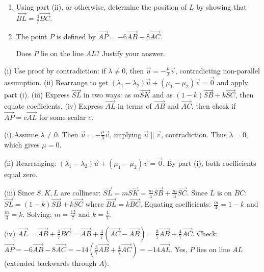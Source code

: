 \begin{problem}
\begin{center}
\end{center}

\vspace{0.3cm}

\begin{enumerate}[resume*, label=(\roman*)]
    \item Using part (ii), or otherwise, determine the position of $L$ by showing that $\vec{BL} = \frac{4}{7}\vec{BC}$.
    
    \item The point $P$ is defined by $\vec{AP} = -6\vec{AB} - 8\vec{AC}$.
    
    Does $P$ lie on the line $AL$? Justify your answer.
\end{enumerate}
\end{problem}

\begin{hint}
(i) Use proof by contradiction: if $\lambda \neq 0$, then $\vec{u} = -\frac{\mu}{\lambda}\vec{v}$, contradicting non-parallel assumption. 
(ii) Rearrange to get $(\lambda_1 - \lambda_2)\vec{u} + (\mu_1 - \mu_2)\vec{v} = \vec{0}$ and apply part (i).
(iii) Express $\vec{SL}$ in two ways: as $m\vec{SK}$ and as $(1-k)\vec{SB} + k\vec{SC}$, then equate coefficients.
(iv) Express $\vec{AL}$ in terms of $\vec{AB}$ and $\vec{AC}$, then check if $\vec{AP} = c\vec{AL}$ for some scalar $c$.
\end{hint}

\begin{solution}[Sketch]
(i) Assume $\lambda \neq 0$. Then $\vec{u} = -\frac{\mu}{\lambda}\vec{v}$, implying $\vec{u} \parallel \vec{v}$, contradiction. Thus $\lambda = 0$, which gives $\mu = 0$.

(ii) Rearranging: $(\lambda_1 - \lambda_2)\vec{u} + (\mu_1 - \mu_2)\vec{v} = \vec{0}$. By part (i), both coefficients equal zero.

(iii) Since $S, K, L$ are collinear: $\vec{SL} = m\vec{SK} = \frac{m}{4}\vec{SB} + \frac{m}{3}\vec{SC}$. Since $L$ is on $BC$: $\vec{SL} = (1-k)\vec{SB} + k\vec{SC}$ where $\vec{BL} = k\vec{BC}$. Equating coefficients: $\frac{m}{4} = 1-k$ and $\frac{m}{3} = k$. Solving: $m = \frac{12}{7}$ and $k = \frac{4}{7}$.

(iv) $\vec{AL} = \vec{AB} + \frac{4}{7}\vec{BC} = \vec{AB} + \frac{4}{7}(\vec{AC} - \vec{AB}) = \frac{3}{7}\vec{AB} + \frac{4}{7}\vec{AC}$. Check: $\vec{AP} = -6\vec{AB} - 8\vec{AC} = -14(\frac{3}{7}\vec{AB} + \frac{4}{7}\vec{AC}) = -14\vec{AL}$. Yes, $P$ lies on line $AL$ (extended backwards through $A$).
\end{solution}

